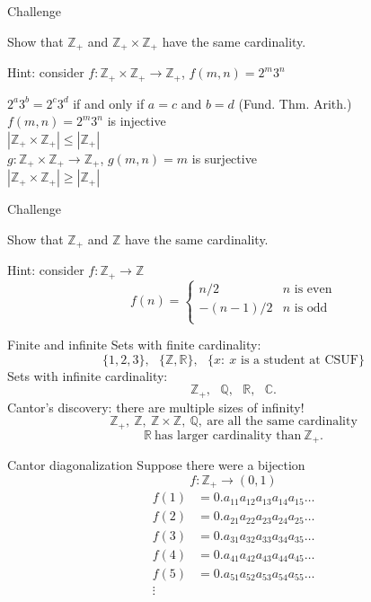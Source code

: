 \documentclass{beamer}
\begin{document}
\begin{frame}{Challenge}
\begin{prob}
Show that $\mathbb{Z}_+$ and $\mathbb{Z}_+\times\mathbb{Z}_+$ have the same cardinality.
\end{prob}
\pause
Hint: consider $f: \mathbb{Z}_+\times\mathbb{Z}_+\rightarrow\mathbb{Z}_+$, $f(m,n) = 2^m3^n$
\begin{soln}
\pause
$2^a3^b = 2^c3^d$ if and only if $a=c$ and $b=d$ (Fund. Thm. Arith.)\\
\pause
$f(m,n) = 2^m3^n$ is injective\\
\pause
$|\mathbb{Z}_+\times\mathbb{Z}_+|\leq |\mathbb{Z}_+|$\\
\pause
$g: \mathbb{Z}_+\times\mathbb{Z}_+\rightarrow\mathbb{Z}_+$, $g(m,n) = m$ is surjective\\
\pause
$|\mathbb{Z}_+\times\mathbb{Z}_+|\geq |\mathbb{Z}_+|$
\end{soln}
\end{frame}

\begin{frame}{Challenge}
\begin{prob}
Show that $\mathbb{Z}_+$ and $\mathbb{Z}$ have the same cardinality.
\end{prob}
\pause
Hint: consider $f: \mathbb{Z}_+\rightarrow\mathbb{Z}$
$$f(n) = \left\lbrace\begin{array}{cc}
n/2 & \text{$n$ is even}\\
-(n-1)/2 & \text{$n$ is odd}\\
\end{array}\right.$$
\end{frame}

\begin{frame}{Finite and infinite}
\pause
Sets with finite cardinality:
$$\{1,2,3\},\ \ \ \{\mathbb{Z},\mathbb{R}\},\ \ \ \{x:\ \text{$x$ is a student at CSUF}\}$$
\pause
Sets with infinite cardinality:
$$\mathbb{Z}_+,\ \ \ \mathbb{Q},\ \ \ \mathbb{R},\ \ \ \mathbb{C}.$$
\pause
Cantor's discovery: there are multiple sizes of infinity!
$$\mathbb{Z}_+,\ \mathbb{Z},\ \mathbb{Z}\times\mathbb{Z},\ \mathbb{Q},\ \text{are all the same cardinality}$$
\pause
$$\mathbb{R}\  \text{has larger cardinality than}\ \mathbb{Z}_+.$$
\end{frame}


\begin{frame}{Cantor diagonalization}
Suppose there were a bijection
$$f: \mathbb{Z}_+\rightarrow (0,1)$$
\pause
\begin{align*}
f(1) &= 0.a_{11}a_{12}a_{13}a_{14}a_{15}\dots\\
f(2) &= 0.a_{21}a_{22}a_{23}a_{24}a_{25}\dots\\
f(3) &= 0.a_{31}a_{32}a_{33}a_{34}a_{35}\dots\\
f(4) &= 0.a_{41}a_{42}a_{43}a_{44}a_{45}\dots\\
f(5) &= 0.a_{51}a_{52}a_{53}a_{54}a_{55}\dots\\
\vdots 
\end{align*}
\end{frame}
\end{document}
